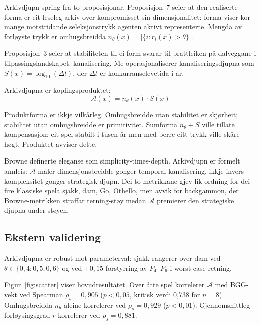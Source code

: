 \documentclass[10pt,twocolumn]{article}
\begin{document}
Arkivdjupn spring fr\aa{} to proposisjonar. Proposisjon~7 seier at den realiserte forma er eit leseleg arkiv over kompromisset sin dimensjonalitet: forma viser kor mange motstridande seleksjonstrykk agenten aktivt representerte. Mengda av forl\o yste trykk er omhugsbreidda $n_\theta(x) = |\{i : r_i(x) > \theta\}|$.

Proposisjon~3 seier at stabiliteten til ei form svarar til brattleiken p\aa{} dalveggane i tilpassingslandskapet: kanalisering. Me operasjonaliserer kanaliseringsdjupna som $S(x) = \log_{10}(\Delta t)$, der $\Delta t$ er konkurranselevetida i \aa r.

Arkivdjupna er koplingsproduktet:
\begin{equation}
\mathcal{A}(x) = n_\theta(x) \cdot S(x)
\end{equation}

Produktforma er ikkje vilk\aa rleg. Omhugsbreidde utan stabilitet er skj\o rheit; stabilitet utan omhugsbreidde er primitivitet. Sumforma $n_\theta + S$ ville tillate kompensasjon: eit spel stabilt i tusen \aa r men med berre eitt trykk ville sk\aa re h\o gt. Produktet avviser dette.

Browne \citep{browne2012} definerte eleganse som simplicity-times-depth. Arkivdjupn er formelt annleis: $\mathcal{A}$ m\aa ler dimensjonsbreidde gonger temporal kanalisering, ikkje invers kompleksitet gonger strategisk djupn. Dei to metrikkane gjev lik ordning for dei fire klassiske spela sjakk, dam, Go, Othello, men avvik for backgammon, der Browne-metrikken straffar terning-st\o y medan $\mathcal{A}$ premierer den strategiske djupna under st\o yen.

\subsection{Ekstern validering}

Arkivdjupna er robust mot parameterval: sjakk rangerer over dam ved $\theta \in \{0{,}4; 0{,}5; 0{,}6\}$ og ved $\pm 0{,}15$ forstyrring av $P_4$--$P_6$ i worst-case-retning.

Figur~\ref{fig:scatter} viser hovudresultatet. Over \aa tte spel korrelerer $\mathcal{A}$ med BGG-vekt ved Spearman $\rho_s = 0{,}905$ ($p < 0{,}05$, kritisk verdi 0,738 for $n = 8$). Omhugsbreidda $n_\theta$ \aa leine korrelerer ved $\rho_s = 0{,}929$ ($p < 0{,}01$). Gjennomsnittleg forl\o ysingsgrad $\bar{r}$ korrelerer ved $\rho_s = 0{,}881$.
\end{document}
